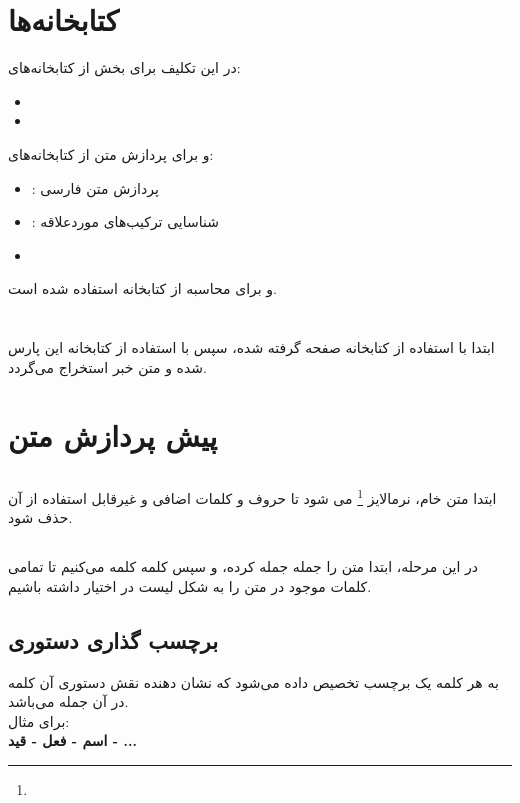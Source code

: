 \documentclass{article}
\begin{document}
	
	
	
	\section*{کتابخانه‌ها}
	در این تکلیف برای بخش 
	از کتابخانه‌های:
	\begin{itemize}
		\item {}
		\item {}
	\end{itemize}
	و برای پردازش متن از کتابخانه‌های: 
	\begin{itemize}
		\item {} : پردازش متن فارسی
		\item {} : شناسایی ترکیب‌های موردعلاقه
		\item {}
	\end{itemize}
	و برای محاسبه 
	از کتابخانه 
	استفاده شده است.
	
	\section*{}
	ابتدا با استفاده از کتابخانه 
	صفحه 
	گرفته شده، سپس با استفاده از کتابخانه
	این
	پارس شده و متن خبر استخراج می‌گردد.
	
	\section*{پیش ‌پردازش متن}
	\subsection{}
	ابتدا متن خام، نرمالایز
	\footnote{}
	می ‌شود تا حروف و کلمات اضافی و غیرقابل استفاده از آن حذف شود.
	
	\subsection{}
	 در این مرحله، ابتدا متن را جمله جمله کرده، و سپس کلمه کلمه می‌کنیم تا تمامی کلمات موجود در متن را به شکل لیست در اختیار داشته باشیم.
	\subsection{برچسب گذاری دستوری}
	 به هر کلمه یک برچسب تخصیص داده می‌شود که نشان دهنده نقش دستوری آن کلمه در آن جمله می‌باشد.\\
	 برای مثال: \\
	 \textbf{
	 	اسم - فعل - قید - ...
	 }
	 
\end{document}
